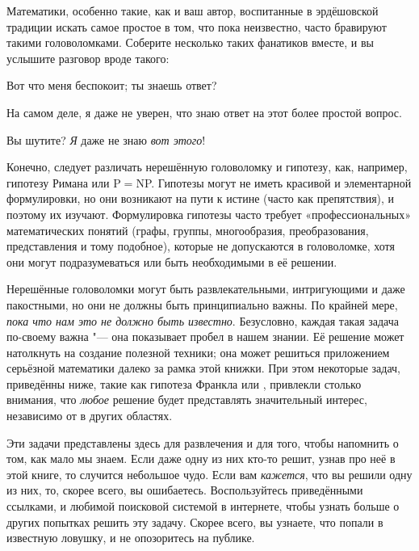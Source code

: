 \documentclass[twoside]{book}
\begin{document}
Математики, особенно такие, как и ваш автор, воспитанные в эрдёшовской традиции искать самое простое в том, что пока неизвестно, часто бравируют такими головоломками.
Соберите несколько таких фанатиков вместе, и вы услышите разговор вроде такого:

Вот что меня беспокоит; ты знаешь ответ?

На самом деле, я даже не уверен, что знаю ответ на этот более простой вопрос.

Вы шутите? \emph{Я} даже не знаю \emph{вот этого}!

Конечно, следует различать нерешённую головоломку и гипотезу, как, например, гипотезу Римана или P${}={}$NP.
Гипотезы могут не иметь красивой и элементарной формулировки, но они возникают на пути к истине (часто как препятствия), и поэтому их изучают.
Формулировка гипотезы часто требует «профессиональных» математических понятий (графы, группы, многообразия, преобразования, представления и тому подобное), которые не допускаются в головоломке, хотя они могут подразумеваться или быть необходимыми в её решении.

Нерешённые головоломки могут быть развлекательными, интригующими и даже пакостными,
но они не должны быть принципиально важны. 
По крайней мере, \emph{пока что нам это не должно быть известно}.
Безусловно, каждая такая задача по-своему важна "--- она показывает пробел в нашем знании.
Её решение может натолкнуть на создание полезной техники;
она может решиться приложением серьёзной математики далеко за рамка этой книжки.
При этом некоторые  задач, приведённы ниже, такие как гипотеза Франкла или , привлекли столько внимания, что \emph{любое} решение будет представлять значительный интерес, независимо от  в других областях.

Эти задачи представлены здесь для развлечения и для того, чтобы напомнить о том, как мало мы знаем.
Если даже одну из них кто-то решит, узнав про неё в этой книге, то случится небольшое чудо.
Если вам \emph{кажется}, что вы решили одну из них, то, скорее всего, вы ошибаетесь.
Воспользуйтесь приведёнными ссылками,  и любимой поисковой системой в интернете, чтобы узнать больше о других попытках решить эту задачу.
Скорее всего, вы узнаете, что попали в известную ловушку, и не опозоритесь на публике.
\end{document}
